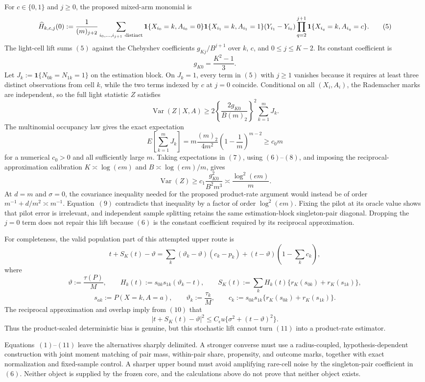 For \(c\in\{0,1\}\) and \(j\ge0\), the proposed mixed-arm monomial is
\[
 \widehat H_{k,c,j}(0)
 :=\frac1{(m)_{j+2}}
 \sum_{i_0,\ldots,i_{j+1}\ {\rm distinct}}
 \mathbf1\{X_{i_0}=k,A_{i_0}=0\}
 \mathbf1\{X_{i_1}=k,A_{i_1}=1\}
 (Y_{i_1}-Y_{i_0})
 \prod_{q=2}^{j+1}\mathbf1\{X_{i_q}=k,A_{i_q}=c\}.
\tag{5}
\]
The light-cell lift sums \((5)\) against the Chebyshev coefficients \(g_{Kj}/B^{j+1}\) over \(k\), \(c\), and \(0\le j\le K-2\). Its constant coefficient is
\[
 g_{K0}=\frac{K^2-1}{3}.
\tag{6}
\]
Let \(J_k:=\mathbf1\{N_{0k}=N_{1k}=1\}\) on the estimation block. On \(J_k=1\), every term in \((5)\) with \(j\ge1\) vanishes because it requires at least three distinct observations from cell \(k\), while the two terms indexed by \(c\) at \(j=0\) coincide. Conditional on all \((X_i,A_i)\), the Rademacher marks are independent, so the full light statistic \(Z\) satisfies
\[
 \operatorname{Var}(Z\mid X,A)
 \ge
 2\left\{\frac{2g_{K0}}{B(m)_2}\right\}^{\!2}
 \sum_{k=1}^m J_k.
\tag{7}
\]
The multinomial occupancy law gives the exact expectation
\[
 E\!\left[\sum_{k=1}^mJ_k\right]
 =m\frac{(m)_2}{4m^2}
 \left(1-\frac1m\right)^{m-2}
 \ge c_0m
\tag{8}
\]
for a numerical \(c_0>0\) and all sufficiently large \(m\). Taking expectations in \((7)\), using \((6)\)--\((8)\), and imposing the reciprocal-approximation calibration \(K\asymp\log(em)\) and \(B\asymp\log(em)/m\), gives
\[
 \operatorname{Var}(Z)
 \ge c_1\frac{g_{K0}^2}{B^2m^3}
 \asymp \frac{\log^2(em)}m.
\tag{9}
\]
At \(d=m\) and \(\sigma=0\), the covariance inequality needed for the proposed product-rate argument would instead be of order \(m^{-1}+d/m^2\asymp m^{-1}\). Equation~\((9)\) contradicts that inequality by a factor of order \(\log^2(em)\). Fixing the pilot at its oracle value shows that pilot error is irrelevant, and independent sample splitting retains the same estimation-block singleton-pair diagonal. Dropping the \(j=0\) term does not repair this lift because \((6)\) is the constant coefficient required by its reciprocal approximation.

For completeness, the valid population part of this attempted upper route is
\[
 t+S_K(t)-\vartheta
 =\sum_k(\vartheta_k-\vartheta)(c_k-p_k)
 +(t-\vartheta)\left(1-\sum_kc_k\right),
\tag{10}
\]
where
\[
 \vartheta:=\frac{\tau(P)}M,\qquad
 H_k(t):=s_{0k}s_{1k}(\vartheta_k-t),\qquad
 S_K(t):=\sum_kH_k(t)\{r_K(s_{0k})+r_K(s_{1k})\},
\]
\[
 s_{ak}:=P(X=k,A=a),\qquad \vartheta_k:=\frac{\tau_k}{M},\qquad
 c_k:=s_{0k}s_{1k}\{r_K(s_{0k})+r_K(s_{1k})\}.
\]
The reciprocal approximation and overlap imply from \((10)\) that
\[
 |t+S_K(t)-\vartheta|^2
 \le C_{\epsilon}u\{\sigma^2+(t-\vartheta)^2\}.
\tag{11}
\]
Thus the product-scaled deterministic bias is genuine, but this stochastic lift cannot turn \((11)\) into a product-rate estimator.

Equations~\((1)\)--\((11)\) leave the alternatives sharply delimited. A stronger converse must use a radius-coupled, hypothesis-dependent construction with joint moment matching of pair mass, within-pair share, propensity, and outcome marks, together with exact normalization and fixed-sample control. A sharper upper bound must avoid amplifying rare-cell noise by the singleton-pair coefficient in \((6)\). Neither object is supplied by the frozen core, and the calculations above do not prove that neither object exists.
